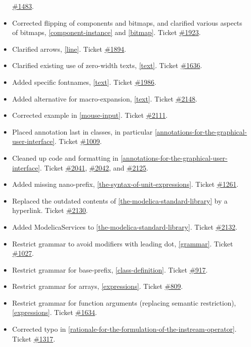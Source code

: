 \begin{itemize}
  \href{https://trac.modelica.org/Modelica/ticket/1483}{\#1483}.
\item
  Corrected flipping of components and bitmaps, and clarified various
  aspects of bitmaps, \autoref{component-instance} and \autoref{bitmap}. Ticket
  \href{https://trac.modelica.org/Modelica/ticket/1923}{\#1923}.
\item
  Clarified arrows, \autoref{line}. Ticket
  \href{https://trac.modelica.org/Modelica/ticket/1894}{\#1894}.
\item
  Clarified existing use of zero-width texts, \autoref{text}. Ticket
  \href{https://trac.modelica.org/Modelica/ticket/1636}{\#1636}.
\item
  Added specific fontnames, \autoref{text}. Ticket
  \href{https://trac.modelica.org/Modelica/ticket/1986}{\#1986}.
\item
  Added alternative for macro-expansion, \autoref{text}. Ticket
  \href{https://trac.modelica.org/Modelica/ticket/2148}{\#2148}.
\item
  Corrected example in \autoref{mouse-input}. Ticket
  \href{https://trac.modelica.org/Modelica/ticket/2111}{\#2111}.
\item
  Placed annotation last in classes, in particular \autoref{annotations-for-the-graphical-user-interface}. Ticket
  \href{https://trac.modelica.org/Modelica/ticket/1009}{\#1009}.
\item
  Cleaned up code and formatting in \autoref{annotations-for-the-graphical-user-interface}. Ticket
  \href{https://trac.modelica.org/Modelica/ticket/2041}{\#2041},
  \href{https://trac.modelica.org/Modelica/ticket/2042}{\#2042}, and
  \href{https://trac.modelica.org/Modelica/ticket/2125}{\#2125}.
\item
  Added missing nano-prefix, \autoref{the-syntax-of-unit-expressions}. Ticket
  \href{https://trac.modelica.org/Modelica/ticket/1261}{\#1261}.
\item
  Replaced the outdated contents of \autoref{the-modelica-standard-library} by a hyperlink. Ticket
  \href{https://trac.modelica.org/Modelica/ticket/2130}{\#2130}.
\item
  Added ModelicaServices to \autoref{the-modelica-standard-library}. Ticket
  \href{https://trac.modelica.org/Modelica/ticket/2132}{\#2132}.
\item
  Restrict grammar to avoid modifiers with leading dot, \autoref{grammar}.
  Ticket \href{https://trac.modelica.org/Modelica/ticket/1027}{\#1027}.
\item
  Restrict grammar for base-prefix, \autoref{class-definition}. Ticket
  \href{https://trac.modelica.org/Modelica/ticket/917}{\#917}.
\item
  Restrict grammar for arrays, \autoref{expressions}. Ticket
  \href{https://trac.modelica.org/Modelica/ticket/809}{\#809}.
\item
  Restrict grammar for function arguments (replacing semantic
  restriction), \autoref{expressions}. Ticket
  \href{https://trac.modelica.org/Modelica/ticket/1634}{\#1634}.
\item
  Corrected typo in \autoref{rationale-for-the-formulation-of-the-instream-operator}. Ticket
  \href{https://trac.modelica.org/Modelica/ticket/1317}{\#1317}.
\end{itemize}

